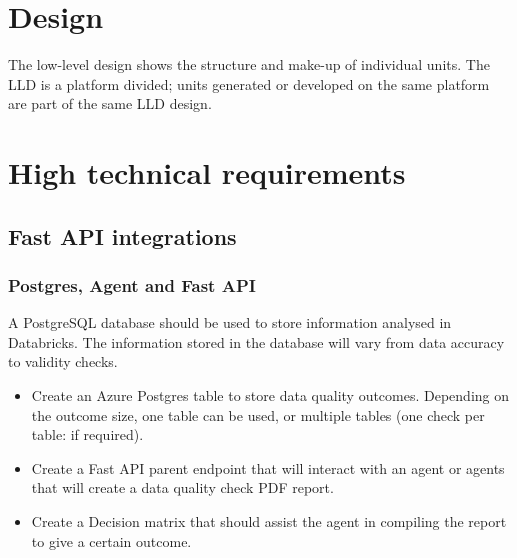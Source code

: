 \documentclass{article}
\begin{document}
 \section{Design}
The low-level design shows the structure and make-up of individual units. The LLD is a platform divided; units generated or developed on the same platform are part of the same LLD design.\\

\section{High technical requirements}
\subsection{Fast API integrations}
\subsubsection{Postgres, Agent and Fast API}
 A PostgreSQL database should be used to store information analysed in Databricks. The information stored in the database will vary from data accuracy to validity checks.
 \begin{itemize}
     \item  Create an Azure Postgres table to store data quality outcomes. Depending on the outcome size, one table can be used, or multiple tables (one check per table: if required).
     \item  Create a Fast API parent endpoint that will interact with an agent or agents that will create a data quality check PDF report.
     \item Create a Decision matrix that should assist the agent in compiling the report to give a certain outcome.
 \end{itemize}
\end{document}
